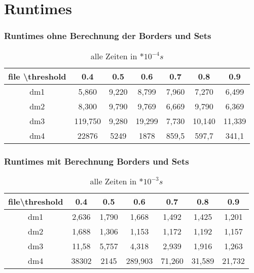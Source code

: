 \documentclass{beamer}
\begin{document}
\section{Runtimes}
\begin{frame} %
	\frametitle{Runtimes ohne Berechnung der Borders und Sets} %
	\begin{table}    
		\centering    
		\begin{tabular}{|c|c|c|c|c|c|c|}    
			\hline file \textbackslash threshold& 0.4& 0.5& 0.6& 0.7& 0.8& 0.9\\
			\hline dm1& 5,860& 9,220& 8,799& 7,960& 7,270& 6,499\\
			\hline dm2& 8,300& 9,790& 9,769& 6,669& 9,790& 6,369\\
			\hline dm3& 119,750& 9,280& 19,299& 7,730& 10,140& 11,339\\
			\hline dm4& 22876& 5249& 1878& 859,5& 597,7& 341,1\\
			\hline 
		\end{tabular}    
		\caption{alle Zeiten in $*10^{-4}s$}    
	\end{table}    
\end{frame}

\begin{frame} %
	\frametitle{Runtimes mit Berechnung Borders und Sets} %
	\begin{table}    
		\centering    
		\begin{tabular}{|c|c|c|c|c|c|c|}    
			\hline file\textbackslash threshold& 0.4& 0.5& 0.6& 0.7& 0.8& 0.9 \\
			\hline dm1& 2,636& 1,790& 1,668& 1,492& 1,425& 1,201\\
			\hline dm2& 1,688& 1,306& 1,153& 1,172& 1,192& 1,157\\
			\hline dm3& 11,58& 5,757& 4,318& 2,939& 1,916& 1,263\\
			\hline dm4& 38302 & 2145& 289,903& 71,260& 31,589& 21,732\\
			\hline 
		\end{tabular}    
		\caption{alle Zeiten in $*10^{-3}s$}    
	\end{table}    
\end{frame}
\end{document}

